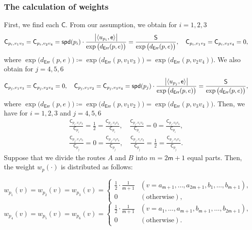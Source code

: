 \documentclass{article}
\numberwithin{equation}{section}
\theoremstyle{definition}
\newcommand{\ee}{\mathsf{e}}
\newcommand{\cc}{\mathsf{C}}
\newcommand{\err}{\mathsf{Err}}
\DeclarePairedDelimiter{\abs}{\lvert}{\rvert}
\newcommand{\spd}{\mathsf{spd}}
\def\:={\coloneqq} %
\begin{document}
\subsubsection*{The calculation of weights} \label{calculate}

First, we find each $\cc$.
From our assumption, we obtain for $i=1,2,3$
\begin{align*}
    \cc_{p_i,v_1v_3} = \cc_{p_i,v_2v_4} 
    = \spd(p_i)\cdot\frac{\abs[\big]{\langle u_{p_i},\ee \rangle}}{\exp\big(d_\err(p,e)\big)} 
    = \frac{\mathsf{S}}{\exp\big(d_\err(p,e)\big)}, \quad
    \cc_{p_i,v_1v_2} = \cc_{p_i,v_3v_4} = 0,
\end{align*}
where $\exp\big(d_\err(p,e)\big)\:=\exp\big(d_\err(p,v_1v_3)\big)=\exp\big(d_\err(p,v_2v_4)\big)$.
We also obtain for $j=4,5,6$
\begin{align*}
    \cc_{p_j,v_1v_3} = \cc_{p_j,v_2v_4} = 0, \quad
    \cc_{p_j,v_1v_2} = \cc_{p_j,v_3v_4} 
    = \spd(p_j)\cdot\frac{\abs[\big]{\langle u_{p_j},\ee \rangle}}{\exp\big(d_\err(p,e)\big)}
    = \frac{\mathsf{S}}{\exp\big(d_\err(p,e)\big)},
\end{align*}
where $\exp\big(d_\err(p,e)\big)\:=\exp\big(d_\err(p,v_1v_2)\big)=\exp\big(d_\err(p,v_3v_4)\big)$.
Then, we have for $i=1,2,3$ and $j=4,5,6$
\begin{align*}
    \frac{\cc_{p_i,v_1v_3}}{\cc_{p_i}} = \frac{1}{2} = \frac{\cc_{p_i,v_2v_4}}{\cc_{p_i}}, \quad
    \frac{\cc_{p_i,v_1v_2}}{\cc_{p_i}} = 0 = \frac{\cc_{p_i,v_3v_4}}{\cc_{p_i}}, \\
    \frac{\cc_{p_j,v_1v_3}}{\cc_{p_j}} = 0 = \frac{\cc_{p_j,v_2v_4}}{\cc_{p_j}}, \quad
    \frac{\cc_{p_j,v_1v_2}}{\cc_{p_j}} = \frac{1}{2} = \frac{\cc_{p_j,v_3v_4}}{\cc_{p_j}}.
\end{align*}
Suppose that we divide the routes $A$ and $B$ into $m=2\mathsf{m}+1$ equal parts.
Then, the weight $w_p(\cdot)$ is distributed as follows:
\begin{center} \vspace{-6mm}
\[ w_{p_1}(v) = w_{p_2}(v) = w_{p_3}(v) = 
\begin{cases}
\frac{1}{2}\cdot\frac{1}{\mathsf{m}+1} & (v=a_{\mathsf{m}+1},\ldots,a_{2\mathsf{m}+1},b_1,\ldots,b_{\mathsf{m}+1}),   \\
0 & (\text{otherwise}), 
\end{cases}\]
\[ w_{p_4}(v) = w_{p_5}(v) = w_{p_6}(v) = 
\begin{cases}
\frac{1}{2}\cdot\frac{1}{\mathsf{m}+1} & (v=a_1,\ldots,a_{\mathsf{m}+1},b_{\mathsf{m}+1},\ldots,b_{2\mathsf{m}+1}),   \\
0 & (\text{otherwise}).
\end{cases}\]
\end{center} 
\end{document}
